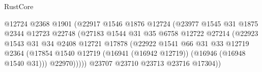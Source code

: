 \begin{lexlean}{RustCore}
\begin{coremodule}
                                            @12724
                                            @2368
                                            @1901
                                            (@22917
                                              @1546
                                              @1876
                                              @12724
                                              (@23977
                                                @1545
                                                @31
                                                @1875
                                                @2344
                                                @12723
                                                @22748
                                                (@27183
                                                  @1544
                                                  @31
                                                  @35
                                                  @6758
                                                  @12722
                                                  @27214
                                                  (@22923
                                                    @1543
                                                    @31
                                                    @34
                                                    @2408
                                                    @12721
                                                    @17878
                                                    (@22922
                                                      @1541
                                                      @66
                                                      @31
                                                      @33
                                                      @12719
                                                      @2364
                                                      (@17854
                                                        @1540
                                                        @12719
                                                        (@16941 (@16942 @12719))
                                                        (@16946 (@16948 @1540 @31)))
                                                      @22970)))))
                                            @23707
                                            @23710
                                            @23713
                                            @23716
                                            @17304))

\end{coremodule}
\end{lexlean}
